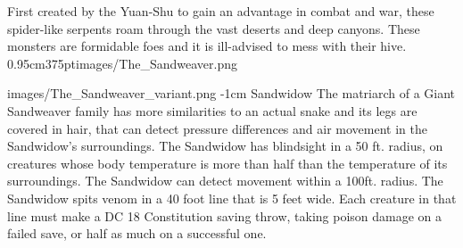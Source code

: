\documentclass[a4paper,openany,twoside,twocolumn]{book}
\begin{document}
%
{%
	First created by the Yuan-Shu to gain an advantage in combat and war, these spider-like serpents roam through the vast deserts and deep canyons. These monsters are formidable foes and it is ill-advised to mess with their hive.%
}{0.95cm}{375pt}{images/The_Sandweaver.png}%

\vfill\eject

\MonsterVariant{0.5em}%
	{images/The_Sandweaver_variant.png}%
	{-1cm} %
	{Sandwidow}%
	{%
		The matriarch of a Giant Sandweaver family has more similarities to an actual snake and its legs are covered in hair, that can detect pressure differences and air movement in the Sandwidow's surroundings.
		 
		The Sandwidow has blindsight in a 50 ft. radius, on creatures whose body temperature is more than half than the temperature of its surroundings.
		The Sandwidow can detect movement within a 100ft. radius.
		The Sandwidow spits venom in a 40 foot line that is 5 feet wide. Each creature in that line must make a DC 18 Constitution saving throw, taking  poison damage on a failed save, or half as much on a successful one.
	}%
\end{document}
